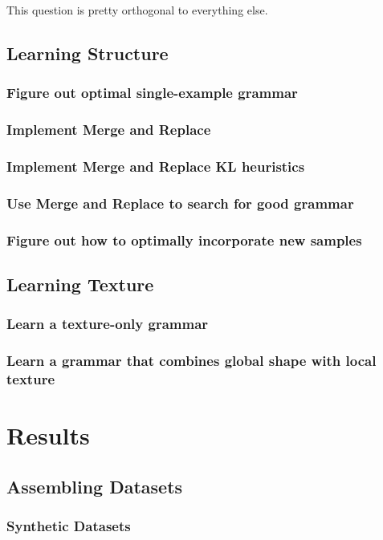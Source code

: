 \documentclass{book}
\begin{document}
This question is pretty orthogonal to everything else.
\section{Learning Structure}
\label{sec-2_7}
\subsection{Figure out optimal single-example grammar}
\label{sec-2_7_1}
\subsection{Implement Merge and Replace}
\label{sec-2_7_2}
\subsection{Implement Merge and Replace KL heuristics}
\label{sec-2_7_3}
\subsection{Use Merge and Replace to search for good grammar}
\label{sec-2_7_4}
\subsection{Figure out how to optimally incorporate new samples}
\label{sec-2_7_5}
\section{Learning Texture}
\label{sec-2_8}
\subsection{Learn a texture-only grammar}
\label{sec-2_8_1}
\subsection{Learn a grammar that combines global shape with local texture}
\label{sec-2_8_2}
\chapter{Results}
\label{sec-3}

\setcounter{section}{-1}
\section{Assembling Datasets}
\label{sec-3_1}
\subsection{Synthetic Datasets}
\label{sec-3_1_1}
\end{document}
